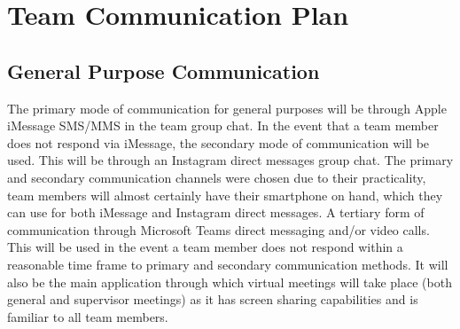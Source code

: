 \documentclass{article}
\begin{document}
\section{Team Communication Plan}
\subsection{General Purpose Communication}
The primary mode of communication for general purposes will be through Apple iMessage SMS/MMS in the team group chat.
In the event that a team member does not respond via iMessage, the secondary mode of communication will be used. This will 
be through an Instagram direct messages group chat. The primary and secondary communication channels were chosen due to their 
practicality, team members will almost certainly have their smartphone on hand, which they can use for both iMessage and Instagram 
direct messages.
A tertiary form of communication through Microsoft Teams direct messaging and/or video calls. This will be used in the event a team 
member does not respond within a reasonable time frame to primary and secondary communication methods. It will also be the main 
application through which virtual meetings will take place (both general and supervisor meetings) as it has screen sharing capabilities 
and is familiar to all team members.
\end{document}
